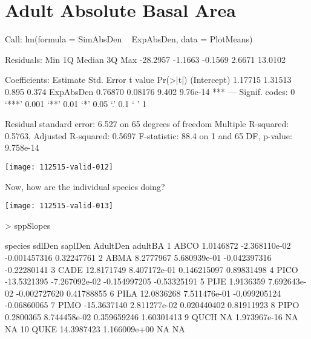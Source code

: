 \documentclass{article}
\begin{document}
\section{Adult Absolute Basal Area}
\begin{Schunk}
\begin{Soutput}
Call:
lm(formula = SimAbsDen ~ ExpAbsDen, data = PlotMeans)

Residuals:
     Min       1Q   Median       3Q      Max 
-28.2957  -1.1663  -0.1569   2.6671  13.0102 

Coefficients:
            Estimate Std. Error t value Pr(>|t|)    
(Intercept)  1.17715    1.31513   0.895    0.374    
ExpAbsDen    0.76870    0.08176   9.402 9.76e-14 ***
---
Signif. codes:  0 ‘***’ 0.001 ‘**’ 0.01 ‘*’ 0.05 ‘.’ 0.1 ‘ ’ 1

Residual standard error: 6.527 on 65 degrees of freedom
Multiple R-squared:  0.5763,	Adjusted R-squared:  0.5697 
F-statistic:  88.4 on 1 and 65 DF,  p-value: 9.758e-14
\end{Soutput}
\end{Schunk}
\texttt{[image: 112515-valid-012]}

Now, how are the individual species doing?

\texttt{[image: 112515-valid-013]}
\begin{Schunk}
\begin{Sinput}
>   sppSlopes
\end{Sinput}
\begin{Soutput}
   species      sdlDen       saplDen     AdultDen     adultBA
1     ABCO   1.0146872 -2.368110e-02 -0.001457316  0.32247761
2     ABMA   8.2777967  5.680939e-01 -0.042397316 -0.22280141
3     CADE  12.8171749  8.407172e-01  0.146215097  0.89831498
4     PICO -13.5321395 -7.267092e-02 -0.154997205 -0.53325191
5     PIJE   1.9136359  7.692643e-02 -0.002727620  0.41788855
6     PILA  12.0836268  7.511476e-01 -0.099205124 -0.06860065
7     PIMO -15.3637140  2.811277e-02  0.020440402  0.81911923
8     PIPO   0.2800365  8.744458e-02  0.359659246  1.60301413
9     QUCH          NA  1.973967e-16           NA          NA
10    QUKE  14.3987423  1.166009e+00           NA          NA
\end{Soutput}
\end{Schunk}
\end{document}
